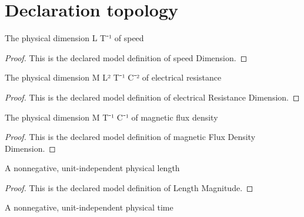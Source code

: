 \section{Declaration topology}
\begin{definition}
  \label{def:physics:phyx-mini-0884:phyxminiproblems-problemphyxmini0884-speeddimension}
  The physical dimension L T⁻¹ of speed
\end{definition}
\begin{proof}
  This is the declared model definition of speed Dimension.
\end{proof}
\begin{definition}
  \label{def:physics:phyx-mini-0884:phyxminiproblems-problemphyxmini0884-electricalresistancedimension}
  The physical dimension M L² T⁻¹ C⁻² of electrical resistance
\end{definition}
\begin{proof}
  This is the declared model definition of electrical Resistance Dimension.
\end{proof}
\begin{definition}
  \label{def:physics:phyx-mini-0884:phyxminiproblems-problemphyxmini0884-magneticfluxdensitydimension}
  The physical dimension M T⁻¹ C⁻¹ of magnetic flux density
\end{definition}
\begin{proof}
  This is the declared model definition of magnetic Flux Density Dimension.
\end{proof}
\begin{definition}
  \label{def:physics:phyx-mini-0884:phyxminiproblems-problemphyxmini0884-lengthmagnitude}
  A nonnegative, unit-independent physical length
\end{definition}
\begin{proof}
  This is the declared model definition of Length Magnitude.
\end{proof}
\begin{definition}
  \label{def:physics:phyx-mini-0884:phyxminiproblems-problemphyxmini0884-timemagnitude}
  A nonnegative, unit-independent physical time
\end{definition}
